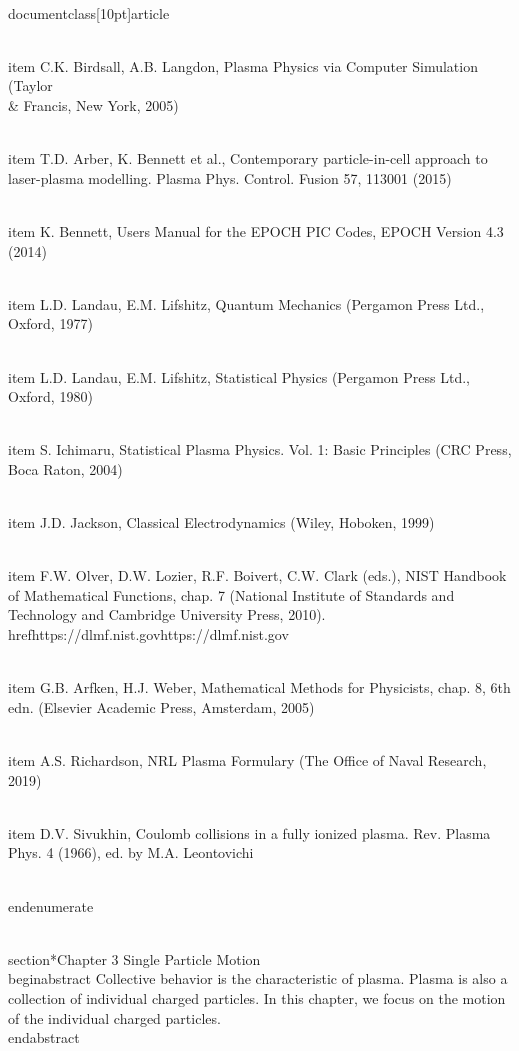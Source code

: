 \\documentclass[10pt]{article}
\begin{document}
  \\item C.K. Birdsall, A.B. Langdon, Plasma Physics via Computer Simulation (Taylor \\& Francis, New York, 2005)

  \\item T.D. Arber, K. Bennett et al., Contemporary particle-in-cell approach to laser-plasma modelling. Plasma Phys. Control. Fusion 57, 113001 (2015)

  \\item K. Bennett, Users Manual for the EPOCH PIC Codes, EPOCH Version 4.3 (2014)

  \\item L.D. Landau, E.M. Lifshitz, Quantum Mechanics (Pergamon Press Ltd., Oxford, 1977)

  \\item L.D. Landau, E.M. Lifshitz, Statistical Physics (Pergamon Press Ltd., Oxford, 1980)

  \\item S. Ichimaru, Statistical Plasma Physics. Vol. 1: Basic Principles (CRC Press, Boca Raton, 2004)

  \\item J.D. Jackson, Classical Electrodynamics (Wiley, Hoboken, 1999)

  \\item F.W. Olver, D.W. Lozier, R.F. Boivert, C.W. Clark (eds.), NIST Handbook of Mathematical Functions, chap. 7 (National Institute of Standards and Technology and Cambridge University Press, 2010). \\href{https://dlmf.nist.gov}{https://dlmf.nist.gov}

  \\item G.B. Arfken, H.J. Weber, Mathematical Methods for Physicists, chap. 8, 6th edn. (Elsevier Academic Press, Amsterdam, 2005)

  \\item A.S. Richardson, NRL Plasma Formulary (The Office of Naval Research, 2019)

  \\item D.V. Sivukhin, Coulomb collisions in a fully ionized plasma. Rev. Plasma Phys. 4 (1966), ed. by M.A. Leontovichi

\\end{enumerate}

\\section*{Chapter 3 Single Particle Motion }
\\begin{abstract}
Collective behavior is the characteristic of plasma. Plasma is also a collection of individual charged particles. In this chapter, we focus on the motion of the individual charged particles.
\\end{abstract}
\end{document}
